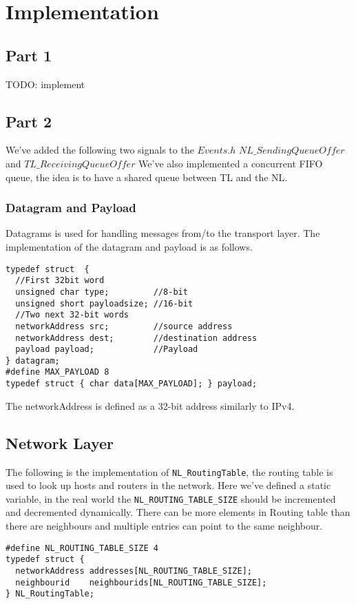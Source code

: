 \section{Implementation}
\subsection{Part 1}
TODO: implement
\subsection{Part 2}
We've added the following two signals to the $Events.h$
$NL\_SendingQueueOffer$
and
\break
$TL\_ReceivingQueueOffer$
We've also implemented a concurrent FIFO queue, the idea is to have a shared queue between TL and the NL.

\subsubsection{Datagram and Payload}
Datagrams is used for handling messages from/to the transport layer.
The implementation of the datagram and payload is as follows.
\begin{lstlisting}
typedef struct  {
  //First 32bit word
  unsigned char type;         //8-bit
  unsigned short payloadsize; //16-bit
  //Two next 32-bit words
  networkAddress src;         //source address
  networkAddress dest;        //destination address
  payload payload;            //Payload
} datagram;
#define MAX_PAYLOAD 8
typedef struct { char data[MAX_PAYLOAD]; } payload;
\end{lstlisting}
The networkAddress is defined as a 32-bit address similarly to IPv4.

\subsection{Network Layer}

The following is the implementation of \texttt{NL\_RoutingTable}, the routing table is used to look up hosts and routers in the network.
Here we've defined a static variable, in the real world the \texttt{NL\_ROUTING\_TABLE\_SIZE} should be incremented and decremented dynamically.
There can be more elements in Routing table than there are neighbours and multiple entries can point to the same neighbour.
\begin{lstlisting}
#define NL_ROUTING_TABLE_SIZE 4
typedef struct {
  networkAddress addresses[NL_ROUTING_TABLE_SIZE];
  neighbourid    neighbourids[NL_ROUTING_TABLE_SIZE];
} NL_RoutingTable;
\end{lstlisting}


